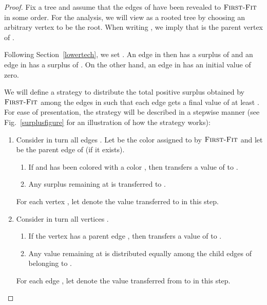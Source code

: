 \documentclass[smallextended]{svjour3}
\newcommand{\FF}{\ensuremath{\operatorname{\textsc{First-Fit}}}\xspace}
\begin{document}
\begin{proof}
Fix a tree  and assume that the edges of  have been revealed to \FF in some order. For the analysis, we will view  as a rooted tree by choosing an arbitrary vertex to be the root. When writing , we imply that  is the parent vertex of . 

Following Section~\ref{lowertech}, we set . An edge in  then has a surplus of  and an edge in  has a surplus of . On the other hand, an edge in  has an initial value of zero. 

We will define a strategy to distribute the total positive surplus obtained by \FF among the edges in  such that each edge gets a final value of at least . For ease of presentation, the strategy will be described in a stepwise manner (see Fig.~\ref{surplusfigure} for an illustration of how the strategy works):

\begin{enumerate}[Step 1:]
\item  Consider in turn all edges . Let  be the color assigned to  by \FF and let  be the parent edge of  (if it exists). 
  \begin{enumerate}
  \item If  and  has been colored with a color ,
    then  transfers a value of  to .
  \item Any surplus remaining at  is
    transferred to .
  \end{enumerate}
  For each vertex , let  denote the value transferred
   to  in this step.
\item Consider in turn all vertices . 
  \begin{enumerate}
  \item If the vertex  has a parent edge , then  transfers a
    value of  to . 
  \item Any value remaining at  is distributed equally among the
    child edges of  belonging to .
  \end{enumerate}
  For each edge , let  denote the value transferred from  to  in this step.
\end{enumerate}

\begin{figure}
\end{figure}
\end{proof}
\end{document}
